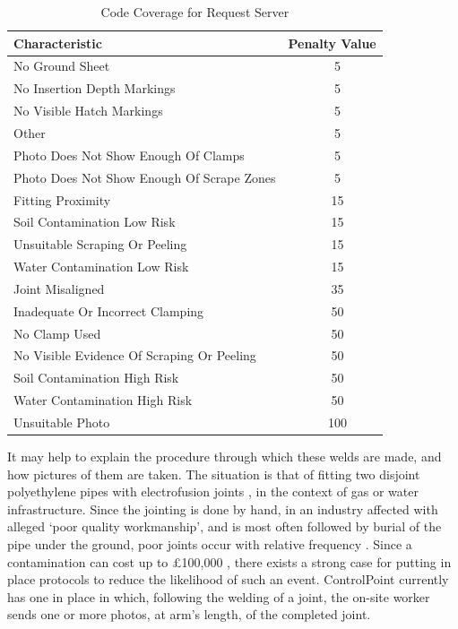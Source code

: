 \documentclass[a4paper,11pt]{article}
\begin{document}
\begin{table}[h]
   \centering
    \begin{tabular}{|l|c|}
    \hline
    Characteristic                 & Penalty Value  \\ \hline
    No Ground Sheet  & ~  5 \\
    No Insertion Depth Markings  & ~ 5 \\
    No Visible Hatch Markings  & ~ 5 \\
    Other  & ~  5 \\
    Photo Does Not Show Enough Of Clamps  & ~ 5 \\
    Photo Does Not Show Enough Of Scrape Zones  & ~ 5 \\
    Fitting Proximity  & ~  15 \\
    Soil Contamination Low Risk  & ~ 15 \\
    Unsuitable Scraping Or Peeling  & ~ 15 \\
    Water Contamination Low Risk  & ~ 15 \\
    Joint Misaligned  & ~  35 \\
    Inadequate Or Incorrect Clamping  & ~ 50 \\
    No Clamp Used  & ~  50 \\
    No Visible Evidence Of Scraping Or Peeling  & ~ 50 \\
    Soil Contamination High Risk  & ~ 50 \\
    Water Contamination High Risk  & ~ 50 \\
    Unsuitable Photo  & ~ 100 \\
    \hline
    \end{tabular}
    \caption {Code Coverage for Request Server}
    \label{f1}
\end{table} 

It may help to explain the procedure through which these welds are made, and how pictures of them are taken. The situation is that of fitting two disjoint polyethylene pipes with electrofusion joints \cite{control-point}, in the context of gas or water infrastructure. Since the jointing is done by hand, in an industry affected with alleged `poor quality workmanship', and is most often followed by burial of the pipe under the ground, poor joints occur with relative frequency \cite{control-point}. Since a contamination can cost up to £100,000 \cite{control-point}, there exists a strong case for putting in place protocols to reduce the likelihood of such an event. ControlPoint currently has one in place in which, following the welding of a joint, the on-site worker sends one or more photos, at arm's length, of the completed joint. \\
\end{document}
